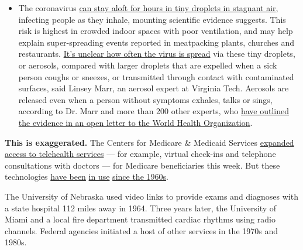 \begin{itemize}
  \begin{itemize}
  \tightlist
  \item
    The coronavirus
    \href{https://www.nytimes3xbfgragh.onion/2020/07/04/health/239-experts-with-one-big-claim-the-coronavirus-is-airborne.html?action=click\&pgtype=Article\&state=default\&region=MAIN_CONTENT_3\&context=storylines_faq}{can
    stay aloft for hours in tiny droplets in stagnant air}, infecting
    people as they inhale, mounting scientific evidence suggests. This
    risk is highest in crowded indoor spaces with poor ventilation, and
    may help explain super-spreading events reported in meatpacking
    plants, churches and restaurants.
    \href{https://www.nytimes3xbfgragh.onion/2020/07/06/health/coronavirus-airborne-aerosols.html?action=click\&pgtype=Article\&state=default\&region=MAIN_CONTENT_3\&context=storylines_faq}{It's
    unclear how often the virus is spread} via these tiny droplets, or
    aerosols, compared with larger droplets that are expelled when a
    sick person coughs or sneezes, or transmitted through contact with
    contaminated surfaces, said Linsey Marr, an aerosol expert at
    Virginia Tech. Aerosols are released even when a person without
    symptoms exhales, talks or sings, according to Dr. Marr and more
    than 200 other experts, who
    \href{https://academic.oup.com/cid/article/doi/10.1093/cid/ciaa939/5867798}{have
    outlined the evidence in an open letter to the World Health
    Organization}.
  \end{itemize}
\end{itemize}

\textbf{This is exaggerated.} The Centers for Medicare \& Medicaid
Services
\href{https://www.cms.gov/newsroom/press-releases/telehealth-benefits-medicare-are-lifeline-patients-during-coronavirus-outbreak}{expanded
access to telehealth services} --- for example, virtual check-ins and
telephone consultations with doctors --- for Medicare beneficiaries this
week. But these technologies
\href{https://www.who.int/goe/publications/goe_telemedicine_2010.pdf\#page=11}{have
been} \href{https://www.ncbi.nlm.nih.gov/books/NBK45445/}{in use}
\href{https://www.ncbi.nlm.nih.gov/books/NBK207141/}{since the 1960s}.

The University of Nebraska used video links to provide exams and
diagnoses with a state hospital 112 miles away in 1964. Three years
later, the University of Miami and a local fire department transmitted
cardiac rhythms using radio channels. Federal agencies initiated a host
of other services in the 1970s and 1980s.

